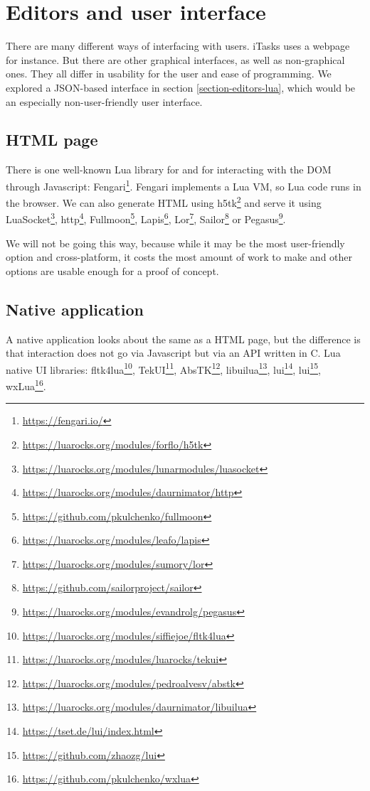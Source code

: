 \section{Editors and user interface}\label{section-editors-ui}
There are many different ways of interfacing with users. iTasks uses a webpage for instance. But there are other graphical interfaces, as well as non-graphical ones. They all differ in usability for the user and ease of programming. We explored a JSON-based interface in section \ref{section-editors-lua}, which would be an especially non-user-friendly user interface.

\subsection{HTML page}
There is one well-known Lua library for and for interacting with the DOM through Javascript: Fengari\footnote{\url{https://fengari.io/}}. Fengari implements a Lua VM, so Lua code runs in the browser. We can also generate HTML using h5tk\footnote{\url{https://luarocks.org/modules/forflo/h5tk}} and serve it using
LuaSocket\footnote{\url{https://luarocks.org/modules/lunarmodules/luasocket}},
http\footnote{\url{https://luarocks.org/modules/daurnimator/http}},
Fullmoon\footnote{\url{https://github.com/pkulchenko/fullmoon}},
Lapis\footnote{\url{https://luarocks.org/modules/leafo/lapis}},
Lor\footnote{\url{https://luarocks.org/modules/sumory/lor}},
Sailor\footnote{\url{https://github.com/sailorproject/sailor}} or
Pegasus\footnote{\url{https://luarocks.org/modules/evandrolg/pegasus}}.

We will not be going this way, because while it may be the most user-friendly option and cross-platform, it costs the most amount of work to make and other options are usable enough for a proof of concept.

\subsection{Native application}
A native application looks about the same as a HTML page, but the difference is that interaction does not go via Javascript but via an API written in C. Lua native UI libraries:
fltk4lua\footnote{\url{https://luarocks.org/modules/siffiejoe/fltk4lua}},
TekUI\footnote{\url{https://luarocks.org/modules/luarocks/tekui}},
AbsTK\footnote{\url{https://luarocks.org/modules/pedroalvesv/abstk}\label{footnote-abstk}},
libuilua\footnote{\url{https://luarocks.org/modules/daurnimator/libuilua}},
lui\footnote{\url{https://tset.de/lui/index.html}},
lui\footnote{\url{https://github.com/zhaozg/lui}},
wxLua\footnote{\url{https://github.com/pkulchenko/wxlua}}.

